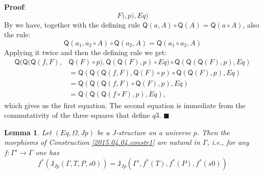 \documentclass[12pt]{article}
\numberwithin{equation}{section}
\newenvironment{eq}{\begin{equation}}{\end{equation}}
\newenvironment{myproof}{{\bf Proof}:}{$\blacksquare$ \vskip 5mm }
\newtheorem{lemma}[proposition]{Lemma}
\newcommand{\llabel}[1]{\label{#1}}
\newcommand{\sr}{\rightarrow}
\newcommand{\J}{\mathsf{J}}
\newcommand{\Q}{\mathsf{Q}}
\begin{document}
\begin{myproof}
$$F),p),Eq)$$
%
By \cite[Lemma 3.2]{fromunivwithPi} we have, together with the defining rule
$\Q(a,A)\circ \Q(A)=\Q(a\circ A)$, also the rule:
%
$$\Q(a_1,a_2\circ A)\circ \Q(a_2,A)=\Q(a_1\circ a_2, A)$$
%
Applying it twice and then the defining rule we get:
%
\begin{align*}
  \Q(\Q(\Q(f,F),&\Q(F)\circ p),\Q(\Q(F),p)\circ Eq)\circ \Q(\Q(\Q(F),p),Eq) \\
    & = \Q(\Q(\Q(f,F),\Q(F)\circ p)\circ \Q(\Q(F),p), Eq) \\
    & = \Q(\Q(\Q(f,F)\circ \Q(F),p),Eq) \\
    & = \Q(\Q(\Q(f\circ F),p),Eq),
\end{align*}
%
which gives us the first equation. The second equation is immediate from the
commutativity of the three squares that define $q3$.
\end{myproof}
%
\begin{lemma}
\llabel{2015.04.04.l1} Let $(Eq,\Omega,Jp)$ be a J-structure on a universe
$p$. Then the morphisms of Construction \ref{2015.04.04.constr1} are natural in
$\Gamma$, i.e., for any $f:\Gamma'\sr \Gamma$ one has
%
\begin{eq}\llabel{2015.04.04.eq3}
f^*(\J_{Jp}(\Gamma,T,P,s0))=\J_{Jp}(\Gamma',f^*(T),f^*(P),f^*(s0))
\end{eq}%
%
\end{lemma}
%
\end{document}
